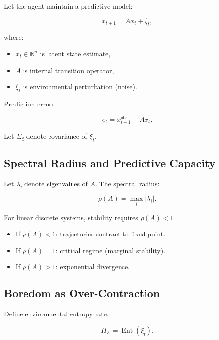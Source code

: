 \documentclass[12pt,a4paper]{article}
\theoremstyle{definition}
\DeclareMathOperator{\Ent}{Ent}
\begin{document}
Let the agent maintain a predictive model:

\begin{equation}
  x_{t+1} = A x_t + \xi_t,
\end{equation}

where:

\begin{itemize}
  \item $x_t \in \mathbb{R}^n$ is latent state estimate,
  \item $A$ is internal transition operator,
  \item $\xi_t$ is environmental perturbation (noise).
\end{itemize}

Prediction error:

\begin{equation}
  e_t = x_{t+1}^{\mathrm{obs}} - A x_t.
\end{equation}

Let $\Sigma_\xi$ denote covariance of $\xi_t$.

\subsection{Spectral Radius and Predictive Capacity}

Let $\lambda_i$ denote eigenvalues of $A$.
The spectral radius:

\begin{equation}
  \rho(A) = \max_i |\lambda_i|.
\end{equation}

For linear discrete systems,
stability requires $\rho(A) < 1$~\citep{strogatz2018}.

\begin{itemize}
  \item If $\rho(A) < 1$: trajectories contract to fixed point.
  \item If $\rho(A) = 1$: critical regime (marginal stability).
  \item If $\rho(A) > 1$: exponential divergence.
\end{itemize}

\subsection{Boredom as Over-Contraction}

Define environmental entropy rate:

\begin{equation}
  H_E = \Ent(\xi_t).
\end{equation}
\end{document}
